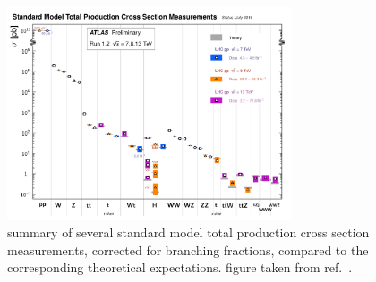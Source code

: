 \begin{figure}[!htb]
    \begin{center}
        \includegraphics[width=0.75\textwidth]{figures/chapter1/sm_final/sm_xsec_summary}
        \caption{
            summary of several standard model total production cross section measurements,
            corrected for branching fractions, compared to the corresponding theoretical expectations. 
            figure taken from ref.~\cite{smsummaryxsec}.
        }
        \label{fig:sm_xsec_summary}
    \end{center}
\end{figure}
